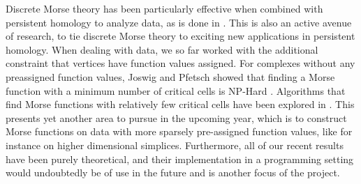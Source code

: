 \documentclass[11pt]{article}
\begin{document}
Discrete Morse theory has been particularly effective when combined with persistent 
homology to analyze data, as is done in
\cite{king,uli-phd,bauer2012optimal,edelsbrunner02,wang18,vcomic2011dimension,edelsbrunner2003hierarchical}.
This is also an active avenue of research, to tie discrete Morse theory to
exciting new applications in persistent homology.
When dealing with data, we so far worked with the 
additional constraint 
that vertices have function values assigned. For
complexes without any preassigned function values,
Joswig and Pfetsch showed that finding a Morse function 
with a minimum number of critical cells is NP-Hard
\cite{joswig04}. Algorithms that find Morse functions with relatively 
few critical cells have been explored in 
\cite{lewiner03,nanda2013morse,hersh05}.
This presents yet another area to pursue in the upcoming year,
which is to construct Morse functions on data with more sparsely 
pre-assigned function values, like for instance on higher dimensional simplices.
Furthermore, all of our recent results have been purely theoretical,
and their implementation in a programming setting
would undoubtedly be of use in the future and is another focus of the project.
\end{document}
